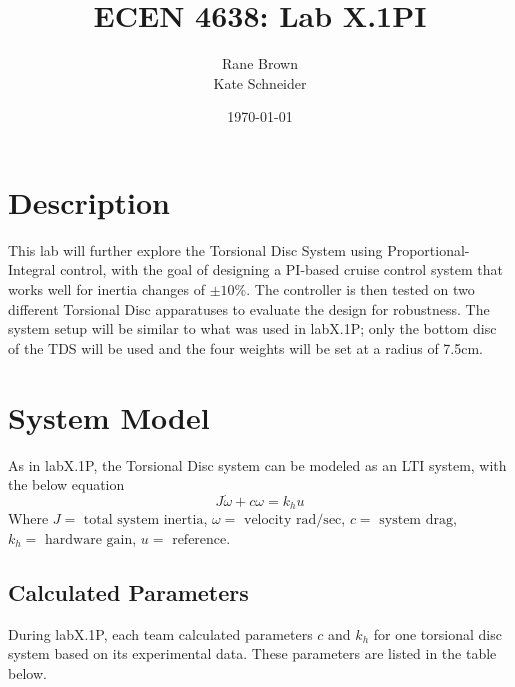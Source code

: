 \documentclass[11pt,titlepage]{article}
\author{Rane Brown \\ Kate Schneider}
\title{ECEN 4638: Lab X.1PI}
\date{\today}
\begin{document}
\maketitle
\tableofcontents
\listoffigures
\newpage

\section{Description}
    This lab will further explore the Torsional Disc System using Proportional-Integral control, with the goal of designing a PI-based cruise control system that works well for inertia changes of $\pm10\%$. The controller is then tested on two different Torsional Disc apparatuses to evaluate the design for robustness. The system setup will be similar to what was used in labX.1P; only the bottom disc of the TDS will be used and the four weights will be set at a radius of 7.5cm.

\section{System Model}
   As in labX.1P, the Torsional Disc system can be modeled as an LTI system, with the below equation
    \begin{equation} \label{eq:lti}
        J\dot{\omega}+c\omega=k_hu
    \end{equation}
    Where $J=\mbox{ total system inertia}$, $\omega=\mbox{ velocity rad/sec}$, $c=\mbox{ system drag}$, $k_h=\mbox{ hardware gain}$, $u=\mbox{ reference}$.
    
    
    \subsection{Calculated Parameters}
        During labX.1P, each team calculated parameters $c$ and $k_h$ for one torsional disc system based on its experimental data. These parameters are listed in the table below.
\end{document}

